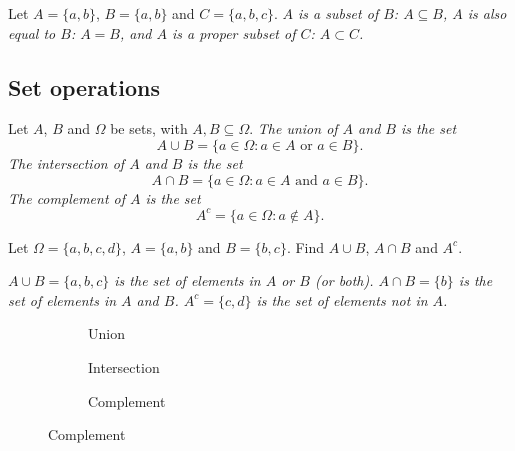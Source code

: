 
\begin{example}
Let $A=\{a,b\}$, $B=\{a,b\}$ and $C=\{a,b,c\}$.
\bit
\it $A$ is a subset of $B$: $A\subseteq B$,
\it $A$ is also equal to $B$: $A=B$, and
\it $A$ is a proper subset of $C$: $A\subset C$.
\eit
\end{example}

\subsection{Set operations}
\begin{definition}
Let $A$, $B$ and $\Omega$ be sets, with $A,B\subseteq \Omega$.
\ben
\it The \emph{union} of $A$ and $B$ is the set
$$
A\cup B = \{a\in \Omega: a\in A \text{ or }a\in B\}.
$$
\it The \emph{intersection} of $A$ and $B$ is the set
$$
A\cap B = \{a\in \Omega: a\in A \text{ and }a\in B\}.
$$
\it The \emph{complement} of $A$ is the set 
$$
A^c=\{a\in \Omega:a\notin A\}.
$$
\een
\end{definition}

\begin{example}
Let $\Omega=\{a,b,c,d\}$, $A=\{a,b\}$ and $B=\{b,c\}$. Find $A\cup B$, $A\cap B$ and $A^c$.
\begin{solution}
\bit
\it $A\cup B = \{a,b,c\}$ is the set of elements in $A$ or $B$ (or both).
\it $A\cap B = \{b\}$ is the set of elements in $A$ and $B$.
\it $A^c = \{c,d\}$ is the set of elements not in $A$.
\eit
\end{solution}
\end{example}

\begin{figure}
\centering
\caption{The basic set operations.}
	\begin{subfigure}{0.3\textwidth}
	\caption{Union}
	\end{subfigure}
	\begin{subfigure}{0.3\textwidth}
	\caption{Intersection}
	\end{subfigure}
	\begin{subfigure}{0.3\textwidth}
	\caption{Complement}
	\end{subfigure}
\end{figure}

